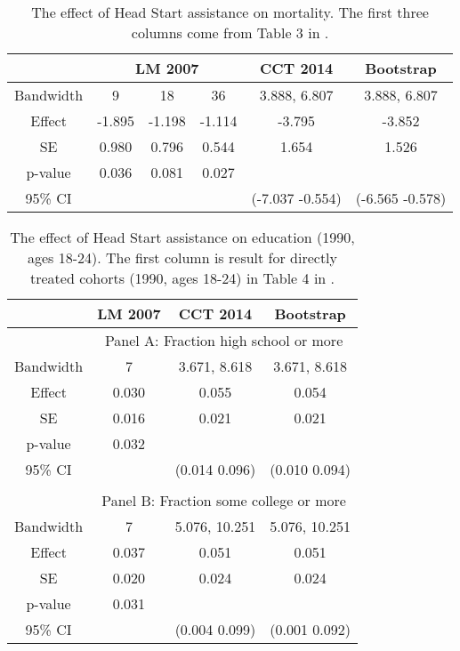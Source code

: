 \documentclass[12pt,fleqn]{article}
\begin{document}
\begin{table}[ht]
	\centering
	\begin{tabular}{cccccc}
		\toprule
		& \multicolumn{3}{c}{LM 2007} & CCT 2014 & Bootstrap \\
		\midrule
		Bandwidth & 9 & 18 & 36 & 3.888, 6.807 & 3.888, 6.807 \\
		Effect    & -1.895 & -1.198 & -1.114 & -3.795 & -3.852 \\
		SE        & 0.980 & 0.796  & 0.544 & 1.654 & 1.526 \\
		p-value   & 0.036   & 0.081   & 0.027  & & \\
		95\% CI   & & & & (-7.037 -0.554) & (-6.565 -0.578) \\
		\bottomrule
	\end{tabular}
	\caption{The effect of Head Start assistance on mortality. The first three columns come from Table 3 in \cite{ludwig2007}.}
	\label{tab: mortality}
\end{table}


\begin{table}[ht]
	\centering
	\begin{tabular}{cccc}
		\toprule
		& LM 2007 & CCT 2014 & Bootstrap \\
		\midrule
		& \multicolumn{3}{c}{Panel A: Fraction high school or more} \\
		Bandwidth & 7 & 3.671, 8.618 & 3.671, 8.618 \\
		Effect    & 0.030 & 0.055 & 0.054 \\
		SE        & 0.016 & 0.021 & 0.021 \\
		p-value   & 0.032 & & \\
		95\% CI        & & (0.014 0.096) & (0.010 0.094) \\
		
		&&& \\
		& \multicolumn{3}{c}{Panel B: Fraction some college or more} \\
		Bandwidth & 7 & 5.076, 10.251 & 5.076, 10.251 \\
		Effect    & 0.037 & 0.051 & 0.051 \\
		SE        & 0.020 & 0.024 & 0.024 \\
		p-value   & 0.031 & & \\
		95\% CI        & & (0.004 0.099) & (0.001 0.092) \\
		\bottomrule
	\end{tabular}
	\caption{The effect of Head Start assistance on education (1990, ages 18-24). The first column is result for directly treated cohorts (1990, ages 18-24) in Table 4 in \cite{ludwig2007}.}
	\label{tab: education 1990 ages 18-24}
\end{table}
\end{document}
